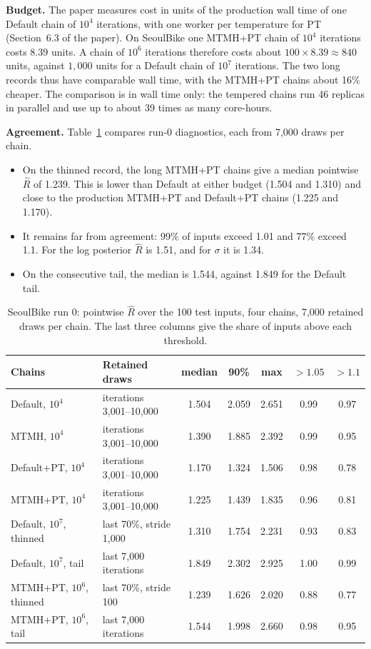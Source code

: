 \documentclass[11pt]{article}
\newcommand{\Rhat}{\hat R}
\begin{document}
\textbf{Budget.} The paper measures cost in units of the production wall time of one Default chain of $10^4$ iterations, with one worker per temperature for PT (Section~6.3 of the paper). On SeoulBike one MTMH+PT chain of $10^4$ iterations costs 8.39 units. A chain of $10^6$ iterations therefore costs about $100\times8.39\approx840$ units, against $1{,}000$ units for a Default chain of $10^7$ iterations. The two long records thus have comparable wall time, with the MTMH+PT chains about 16\% cheaper. The comparison is in wall time only: the tempered chains run 46 replicas in parallel and use up to about 39 times as many core-hours.

\textbf{Agreement.} Table~\ref{tab:long-pt} compares run-0 diagnostics, each from 7,000 draws per chain.
\begin{itemize}
\item On the thinned record, the long MTMH+PT chains give a median pointwise $\Rhat$ of 1.239. This is lower than Default at either budget (1.504 and 1.310) and close to the production MTMH+PT and Default+PT chains (1.225 and 1.170).
\item It remains far from agreement: 99\% of inputs exceed 1.01 and 77\% exceed 1.1. For the log posterior $\Rhat$ is 1.51, and for $\sigma$ it is 1.34.
\item On the consecutive tail, the median is 1.544, against 1.849 for the Default tail.
\end{itemize}

\begin{table}[h]
\centering
\small
\caption{SeoulBike run 0: pointwise $\Rhat$ over the 100 test inputs, four chains, 7,000 retained draws per chain. The last three columns give the share of inputs above each threshold.}
\label{tab:long-pt}
\begin{tabular}{llccccc}
\toprule
Chains & Retained draws & median & 90\% & max & $>1.05$ & $>1.1$ \\
\midrule
Default, $10^4$ & iterations 3,001--10,000 & 1.504 & 2.059 & 2.651 & 0.99 & 0.97 \\
MTMH, $10^4$ & iterations 3,001--10,000 & 1.390 & 1.885 & 2.392 & 0.99 & 0.95 \\
Default+PT, $10^4$ & iterations 3,001--10,000 & 1.170 & 1.324 & 1.506 & 0.98 & 0.78 \\
MTMH+PT, $10^4$ & iterations 3,001--10,000 & 1.225 & 1.439 & 1.835 & 0.96 & 0.81 \\
Default, $10^7$, thinned & last 70\%, stride 1,000 & 1.310 & 1.754 & 2.231 & 0.93 & 0.83 \\
Default, $10^7$, tail & last 7,000 iterations & 1.849 & 2.302 & 2.925 & 1.00 & 0.99 \\
MTMH+PT, $10^6$, thinned & last 70\%, stride 100 & 1.239 & 1.626 & 2.020 & 0.88 & 0.77 \\
MTMH+PT, $10^6$, tail & last 7,000 iterations & 1.544 & 1.998 & 2.660 & 0.98 & 0.95 \\
\bottomrule
\end{tabular}
\end{table}
\end{document}

